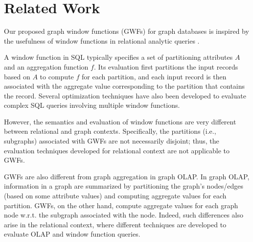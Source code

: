 \section{Related Work}
Our proposed graph window functions (GWFs) for graph databases is inspired by the usefulness of window functions in relational analytic queries
\cite{zemke2012s}.

A window function in SQL typically specifies a set of partitioning attributes $A$ and an aggregation function $f$.
Its evaluation first partitions the input records based on $A$ to compute $f$ for each partition,
and each input record is then associated with the aggregate value corresponding to the partition that contains the record.
Several optimization techniques \cite{cao2012optimization, bellamkonda2013adaptive}
have also been developed to evaluate complex SQL queries involving multiple window functions.

However, the semantics and evaluation of window functions are very different between relational and graph contexts.
Specifically, the partitions (i.e., subgraphs) associated with GWFs are not necessarily disjoint; thus,
the evaluation techniques developed for relational context \cite{cao2012optimization, bellamkonda2013adaptive} are not applicable to GWFs. %

GWFs are also different from graph aggregation \cite{zhao2011graph,wang2014pagrol,chen2008graph,tian2008efficient} in graph OLAP.
In graph OLAP, information in a graph are summarized
by partitioning the graph's nodes/edges (based on some attribute values) and computing aggregate values for each partition.
GWFs, on the other hand, compute aggregate values for each graph node w.r.t. the subgraph associated with the node.
Indeed, such differences also arise in the relational context, where different 
techniques are developed to evaluate OLAP and window function queries.

